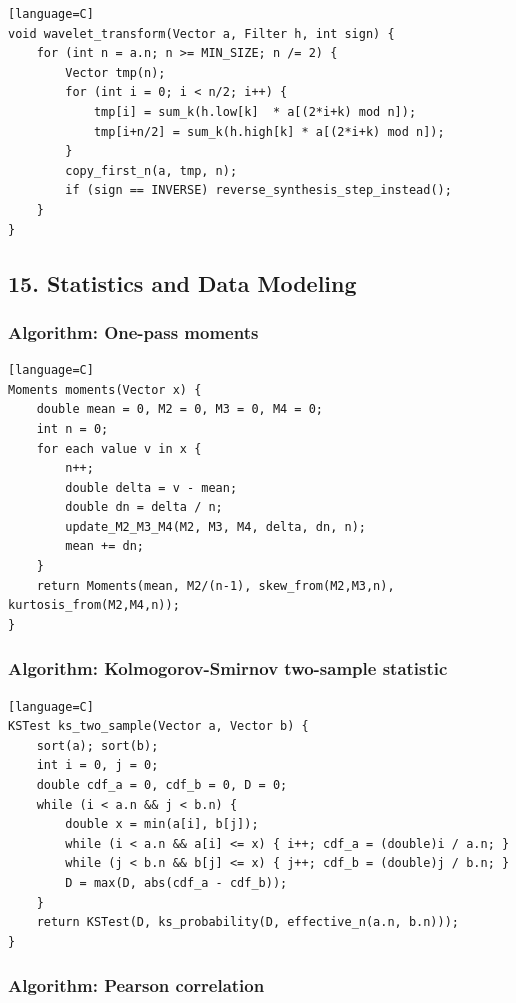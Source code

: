 \documentclass[11pt]{article}
\begin{document}
\begin{verbatim}[language=C]
void wavelet_transform(Vector a, Filter h, int sign) {
    for (int n = a.n; n >= MIN_SIZE; n /= 2) {
        Vector tmp(n);
        for (int i = 0; i < n/2; i++) {
            tmp[i] = sum_k(h.low[k]  * a[(2*i+k) mod n]);
            tmp[i+n/2] = sum_k(h.high[k] * a[(2*i+k) mod n]);
        }
        copy_first_n(a, tmp, n);
        if (sign == INVERSE) reverse_synthesis_step_instead();
    }
}
\end{verbatim}

\subsection{15. Statistics and Data Modeling}\label{statistics-and-data-modeling}

\subsubsection{Algorithm: One-pass moments}\label{algorithm-one-pass-moments}

\begin{verbatim}[language=C]
Moments moments(Vector x) {
    double mean = 0, M2 = 0, M3 = 0, M4 = 0;
    int n = 0;
    for each value v in x {
        n++;
        double delta = v - mean;
        double dn = delta / n;
        update_M2_M3_M4(M2, M3, M4, delta, dn, n);
        mean += dn;
    }
    return Moments(mean, M2/(n-1), skew_from(M2,M3,n), kurtosis_from(M2,M4,n));
}
\end{verbatim}

\subsubsection{Algorithm: Kolmogorov-Smirnov two-sample statistic}\label{algorithm-kolmogorov-smirnov-two-sample-statistic}

\begin{verbatim}[language=C]
KSTest ks_two_sample(Vector a, Vector b) {
    sort(a); sort(b);
    int i = 0, j = 0;
    double cdf_a = 0, cdf_b = 0, D = 0;
    while (i < a.n && j < b.n) {
        double x = min(a[i], b[j]);
        while (i < a.n && a[i] <= x) { i++; cdf_a = (double)i / a.n; }
        while (j < b.n && b[j] <= x) { j++; cdf_b = (double)j / b.n; }
        D = max(D, abs(cdf_a - cdf_b));
    }
    return KSTest(D, ks_probability(D, effective_n(a.n, b.n)));
}
\end{verbatim}

\subsubsection{Algorithm: Pearson correlation}\label{algorithm-pearson-correlation}
\end{document}
